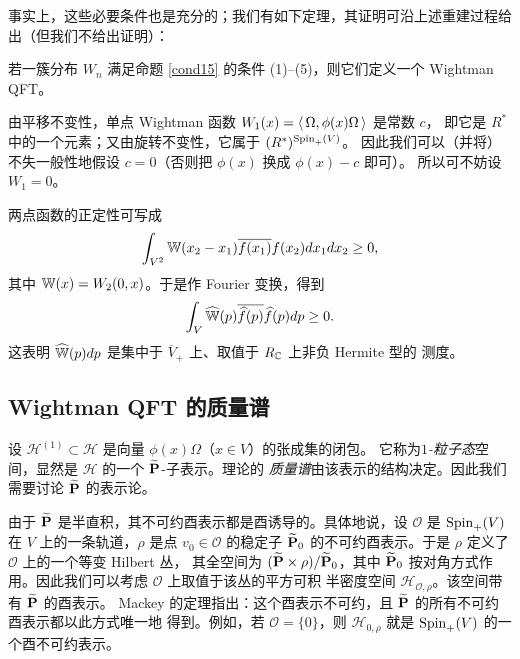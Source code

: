 事实上，这些必要条件也是充分的；我们有如下定理，其证明可沿上述重建过程给出（但我们不给出证明）：

\begin{theorem} 若一簇分布 $W_n$ 满足命题 \ref{cond15} 的条件 (1)--(5)，则它们定义一个
Wightman QFT。
\end{theorem} 

\begin{remark} 由平移不变性，单点 Wightman 函数 $W_1(x)=\la \Omega,\phi(x)\Omega\ra$ 是常数 $c$，
即它是 $R^*$ 中的一个元素；又由旋转不变性，它属于 $(R^*)^{{\rm Spin}_+(V)}$。
因此我们可以（并将）不失一般性地假设 $c=0$（否则把 $\phi(x)$ 换成 $\phi(x)-c$ 即可）。
所以可不妨设 $W_1=0$。
\end{remark} 

\begin{remark}\label{ft} 两点函数的正定性可写成
$$
\int_{V^2}\Bbb W(x_2-x_1)\overline{f(x_1)}f(x_2)dx_1dx_2\ge 0,
$$
其中 $\Bbb W(x)=W_2(0,x)$。于是作 Fourier 变换，得到
$$
\int_{V}\widehat{\Bbb W}(p)\overline {\widehat f(p)}\widehat f(p)dp\ge 0.
$$
这表明 $\widehat{\Bbb W}(p)dp$ 是集中于 $\overline V_+$ 上、取值于 $R_{\Bbb C}$ 上非负 Hermite 型的
测度。
\end{remark} 


\subsection{Wightman QFT 的质量谱}

设 $\mathcal H^{(1)}\subset \mathcal H$ 是向量 $\phi(x)\Omega$（$x\in V$）的张成集的闭包。
它称为\emph{$1$-粒子态}空间，显然是 $\mathcal H$ 的一个 $\widetilde{\bold P}$-子表示。理论的
\emph{质量谱}由该表示的结构决定。因此我们需要讨论 $\widetilde{\bold P}$ 的表示论。

由于 $\widetilde{\bold P}$ 是半直积，其不可约酉表示都是酉诱导的。具体地说，设 $\mathcal O$ 是
${\rm Spin}_+(V)$ 在 $V$ 上的一条轨道，$\rho$ 是点 $v_0\in \mathcal O$ 的稳定子
$\widetilde{\bold P}_0$ 的不可约酉表示。于是 $\rho$ 定义了 $\mathcal O$ 上的一个等变 Hilbert 丛，
其全空间为 $(\widetilde{\bold P}\times \mathcal \rho)/\widetilde{\bold P}_0$，其中
$\widetilde{\bold P}_0$ 按对角方式作用。因此我们可以考虑 $\mathcal O$ 上取值于该丛的平方可积
半密度空间 $\mathcal H_{\mathcal O,\rho}$。该空间带有 $\widetilde{\bold P}$ 的酉表示。
Mackey 的定理指出：这个酉表示不可约，且 $\widetilde{\bold P}$ 的所有不可约酉表示都以此方式唯一地
得到。例如，若 $\mathcal O=\lbrace 0\rbrace$，则 $\mathcal H_{0,\rho}$ 就是 ${\rm Spin}_+(V)$
的一个酉不可约表示。

